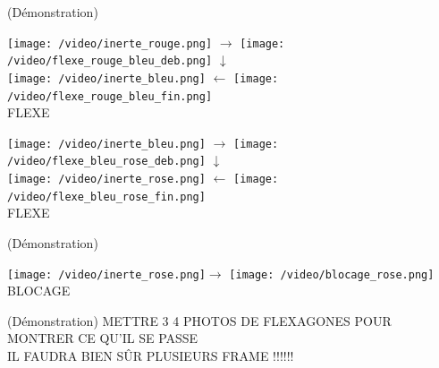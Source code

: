 \documentclass[french,xcolor=dvipsnames]{beamer}
\begin{document}
		\begin{frame}{(Démonstration)}
		\begin{center}
			\texttt{[image: /video/inerte\_rouge.png]}
			\Large{$\longrightarrow$}
			\texttt{[image: /video/flexe\_rouge\_bleu\_deb.png]} \Large{$\downarrow$}\\
			\texttt{[image: /video/inerte\_bleu.png]}
			\Large{$\longleftarrow$}
			\texttt{[image: /video/flexe\_rouge\_bleu\_fin.png]}\\
			\LARGE{FLEXE}
			
		\end{center}
		\end{frame}
		
		\begin{frame}
		\begin{center}
			\texttt{[image: /video/inerte\_bleu.png]}
			\Large{$\longrightarrow$}
			\texttt{[image: /video/flexe\_bleu\_rose\_deb.png]} \Large{$\downarrow$}\\
			\texttt{[image: /video/inerte\_rose.png]}
			\Large{$\longleftarrow$}
			\texttt{[image: /video/flexe\_bleu\_rose\_fin.png]}\\
			\LARGE{FLEXE}
		\end{center}
		\end{frame}
		
		\begin{frame}{(Démonstration)}
		\begin{center}
			\texttt{[image: /video/inerte\_rose.png]}\Large{$\longrightarrow$}
			\texttt{[image: /video/blocage\_rose.png]}\\
			\LARGE{BLOCAGE}
		\end{center}
		\end{frame}
		
		\begin{frame}{(Démonstration)}
			METTRE 3 4 PHOTOS DE FLEXAGONES POUR MONTRER CE QU'IL SE PASSE\\
			IL FAUDRA BIEN SÛR PLUSIEURS FRAME !!!!!!
		\end{frame}
		
\end{document}

